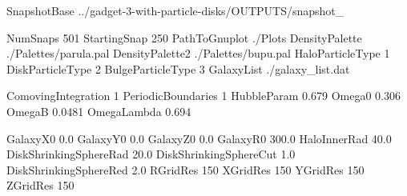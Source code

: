 %
%




SnapshotBase       ../gadget-3-with-particle-disks/OUTPUTS/snapshot_

NumSnaps           501
StartingSnap       250
PathToGnuplot      ./Plots
DensityPalette     ./Palettes/parula.pal
DensityPalette2    ./Palettes/bupu.pal
HaloParticleType   1
DiskParticleType   2
BulgeParticleType  3
GalaxyList         ./galaxy_list.dat


ComovingIntegration    1
PeriodicBoundaries     1
HubbleParam            0.679
Omega0                 0.306
OmegaB                 0.0481
OmegaLambda            0.694


GalaxyX0                0.0
GalaxyY0                0.0
GalaxyZ0                0.0
GalaxyR0                300.0
HaloInnerRad            40.0
DiskShrinkingSphereRad  20.0
DiskShrinkingSphereCut  1.0
DiskShrinkingSphereRed  2.0
RGridRes                150
XGridRes                150
YGridRes                150
ZGridRes                150
